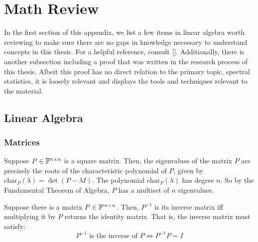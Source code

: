 \chapter{Math Review}

\noindent In the first section of this appendix, we list a few items in linear algebra worth reviewing to make sure there are no gaps in knowledge necessary to understand concepts in this thesis.
For a helpful reference, consult [\cite{horn}].
Additionally, there is another subsection including a proof that was written in the research process of this thesis. Albeit this proof has no direct relation to the primary topic, spectral statistics, it is loosely relevant and displays the tools and techniques relevant to the material.

\section{Linear Algebra}
\subsection{Matrices}
\begin{definition}[Eigenvalue]
Suppose $P \in \mathbb{F}^{n \times n}$ is a square matrix. Then, the eigenvalues of the matrix $P$ are precisely the roots of the characteristic polynomial of $P$, given by $\text{char}_P(\lambda) = \det(P - \lambda I)$. The polynomial $\text{char}_P(\lambda)$ has degree $n$. So by the Fundamental Theorem of Algebra, $P$ has a multiset of $n$ eigenvalues.
\end{definition}


\begin{definition}
Suppose there is a matrix $P \in \mathbb{F}^{m\times n}$. Then, $P^{-1}$ is its inverse matrix iff multiplying it by $P$ returns the identity matrix. That is, the inverse matrix must satisfy:
$$ P^{-1} \text{ is the inverse of } P \iff P^{-1} P = I$$
\end{definition}

